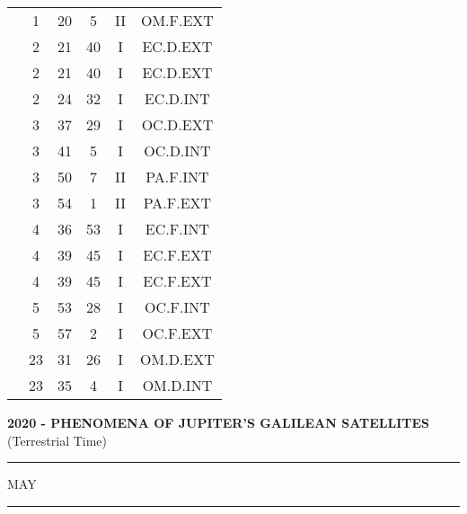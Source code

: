 \documentclass[12pt, a4paper]{article}
\begin{document}
\begin{multicols}{3}
{\begin{tabular}{c c c c c c}
	 	 	 	 & 1 & 20 & 5 & II & OM.F.EXT\\%
	 	 	 	 & 2 & 21 & 40 & I & EC.D.EXT\\%
	 	 	 	 & 2 & 21 & 40 & I & EC.D.EXT\\%
	 	 	 	 & 2 & 24 & 32 & I & EC.D.INT\\%
	 	 	 	 & 3 & 37 & 29 & I & OC.D.EXT\\%
	 	 	 	 & 3 & 41 & 5 & I & OC.D.INT\\%
	 	 	 	 & 3 & 50 & 7 & II & PA.F.INT\\%
	 	 	 	 & 3 & 54 & 1 & II & PA.F.EXT\\%
	 	 	 	 & 4 & 36 & 53 & I & EC.F.INT\\%
	 	 	 	 & 4 & 39 & 45 & I & EC.F.EXT\\%
	 	 	 	 & 4 & 39 & 45 & I & EC.F.EXT\\%
	 	 	 	 & 5 & 53 & 28 & I & OC.F.INT\\%
	 	 	 	 & 5 & 57 & 2 & I & OC.F.EXT\\%
	 	 	 	 & 23 & 31 & 26 & I & OM.D.EXT\\%
	 	 	 	 & 23 & 35 & 4 & I & OM.D.INT\\%
	 	 \end{tabular}
 	}
\end{multicols}
\textbf{2020 - PHENOMENA OF JUPITER'S GALILEAN SATELLITES}\\(Terrestrial Time) 
\vspace{0.1cm} \hrule \vspace{0.1cm}
MAY\vspace{0.1cm}
\hrule
\vspace{-0.2cm}
\end{document}
